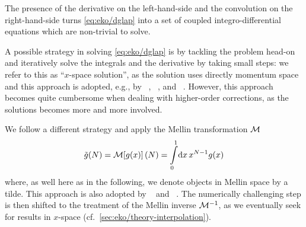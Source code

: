 The presence of the derivative on the left-hand-side and the convolution on the
right-hand-side turns \cref{eq:eko/dglap} into a set of coupled
integro-differential equations which are non-trivial to solve.

A possible strategy in solving \cref{eq:eko/dglap} is by tackling the problem
head-on and iteratively solve the integrals and the derivative by taking small
steps: we refer to this as \enquote{$x$-space solution}, as the solution uses
directly momentum space and this approach is adopted, e.g., by \apfel{}~\cite{Bertone:2013vaa},
\hoppet{}~\cite{Salam:2008qg}, and \qcdnum{}~\cite{Botje:2010ay}.
However, this approach becomes quite cumbersome when dealing with higher-order
corrections, as the solutions becomes more and more involved.

We follow a different strategy and apply the Mellin transformation $\mathcal{M}$
\begin{equation}
    \tilde g(N) = \mathcal{M}\qty[g(x)](N) = \int\limits_0^1\!\dd{x} x^{N-1} g(x)
\end{equation}
where, as well here as in the following, we denote objects in Mellin space by a
tilde.
This approach is also adopted by \pegasus{}~\cite{Vogt:2004ns} and \fk{}~\cite{Ball:2008by,Ball:2010de,DelDebbio:2007ee}.
The numerically challenging step is then shifted to the treatment of the Mellin
inverse $\mathcal{M}^{-1}$, as we eventually seek for results in $x$-space (cf.\
\cref{sec:eko/theory-interpolation}).
